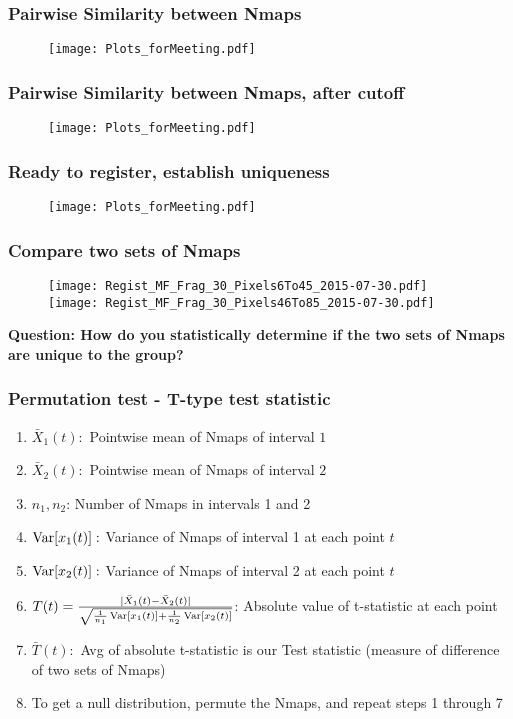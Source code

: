 \documentclass[10pt,dvipsnames,table]{beamer}
\begin{document}
\begin{frame}
\frametitle{Pairwise Similarity between Nmaps}
\begin{figure}
\texttt{[image: Plots\_forMeeting.pdf]}
\end{figure}
\end{frame}

\begin{frame}
\frametitle{Pairwise Similarity between Nmaps, after cutoff}
\begin{figure}
\texttt{[image: Plots\_forMeeting.pdf]}
\end{figure}
\end{frame}

\begin{frame}
\frametitle{Ready to register, establish uniqueness}
\begin{figure}
\texttt{[image: Plots\_forMeeting.pdf]}
\end{figure}
\end{frame}

\begin{frame}
\frametitle{Compare two sets of Nmaps}
\begin{center}
\begin{figure}
\texttt{[image: Regist\_MF\_Frag\_30\_Pixels6To45\_2015-07-30.pdf]}
\pause
\texttt{[image: Regist\_MF\_Frag\_30\_Pixels46To85\_2015-07-30.pdf]}
\end{figure}
\end{center}
{\bf{Question: How do you statistically determine if the two sets of Nmaps are unique to the group?}}
\end{frame}

\begin{frame}
\frametitle{Permutation test - T-type test statistic}
\begin{enumerate}
\item $\bar{X}_1(t): $ Pointwise mean of Nmaps of interval $1$
\item $\bar{X}_2(t): $ Pointwise mean of Nmaps of interval $2$
\item $n_1, n_2$: Number of Nmaps in intervals 1 and 2
\item $\operatorname{Var}[x_1(t)]: $ Variance of Nmaps of interval 1 at each point $t$ 
\item $\operatorname{Var}[x_2(t)]: $ Variance of Nmaps of interval 2 at each point $t$ 
\item $T(t) = \frac{|\bar{X}_1(t) - \bar{X}_2(t)|}{\sqrt{\frac{1}{n_1}\operatorname{Var}[x_1(t)] + 
\frac{1}{n_2}\operatorname{Var}[x_2(t)]}}$: Absolute value of t-statistic at each point
\item $\bar{T}(t):$ Avg of absolute t-statistic is our Test statistic (measure of difference of two sets of Nmaps)
\item To get a null distribution, permute the Nmaps, and repeat steps 1 through 7
\end{enumerate}
\end{frame}
\end{document}
